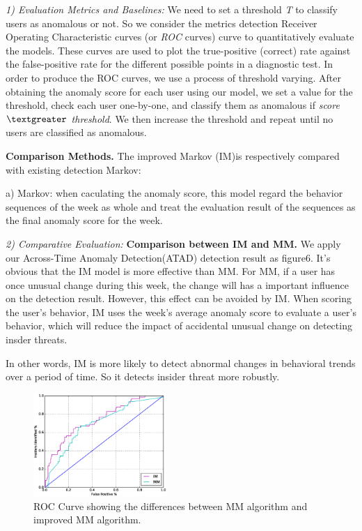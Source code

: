 \documentclass[conference]{IEEEtran}
\begin{document}
\emph{1) Evaluation Metrics and Baselines:}
We need to set a
threshold \emph{T} to classify users as anomalous or not. 
So we consider the metrics detection Receiver
Operating Characteristic curves (or \emph{ROC} curves) curve to quantitatively evaluate the models. These curves are used to plot the true-positive (correct) rate against the false-positive rate for the different possible points in a diagnostic test. In order to produce the ROC curves, we use a process of threshold varying. After obtaining the anomaly score for each user using our model, we set a value for
the threshold, check each user one-by-one, and
classify them as anomalous if \emph{score $\textgreater$ threshold}.
We then increase the threshold and repeat until no users are classified as anomalous.

\textbf{Comparison Methods.}
The improved Markov (IM)is respectively compared with existing detection Markov:

a) Markov: when caculating the anomaly score, this model regard the behavior sequences of the week as whole and treat the evaluation result of the sequences as the final anomaly score for the week.

\emph{2) Comparative Evaluation:} 
\textbf{Comparison between IM and MM.}
We apply our Across-Time Anomaly Detection(ATAD) detection result as figure6. It's obvious that the IM model is more effective than MM. For MM, if a user has once unusual change during this week, the change will has a important influence on the detection result. However, this effect can be avoided by IM. When scoring the user's behavior, IM uses the week's average anomaly score to evaluate a user's behavior, which will reduce the impact of accidental unusual change on detecting insder threats.

In other words, IM is more likely to detect abnormal changes in behavioral trends over a period of time. So it detects insider threat more robustly. 



\begin{figure}[htb]
\centerline{\includegraphics[width = 0.45\textwidth]{figure/figure7.eps}}
\caption{ROC Curve showing the differences between MM algorithm and improved MM algorithm.}
\label{fig}
\end{figure}
\end{document}
